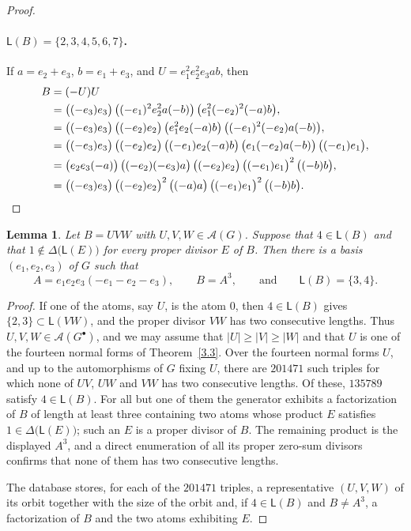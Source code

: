 \documentclass[a4paper, 10pt]{amsart}
\theoremstyle{plain}
\newtheorem{lemma}[theorem]{\bf Lemma}
\theoremstyle{definition}
\theoremstyle{definition}
\newcommand{\code}[1]{\texttt{\detokenize{#1}}}
\numberwithin{equation}{section}
\begin{document}
\begin{proof}
	\paragraph*{$\mathsf L(B)=\{2,3,4,5,6,7\}$.}
	If $a=e_2+e_3$,  $b=e_1+e_3$, and 
	$U=e_1^2e_2^2e_3ab$, then
	\begin{align*}
	B & = (-U)U \\
	&= \big( (-e_3){e_3}\big) \,\bigl((-e_1)^2e_2^2a(-b)\bigr) \,\bigl(e_1^2(-e_2)^2(-a)b\bigr),\\
	&= \big( (-e_3){e_3}\big) \, \big( (-e_2){e_2}\big)
	\,\bigl(e_1^2e_2(-a)b\bigr)
	\,\bigl((-e_1)^2(-e_2)a(-b)\bigr),\\
	&= \big( (-e_3){e_3}\big) \, \big( (-e_2){e_2}\big)
	\,\bigl((-e_1)e_2(-a)b\bigr)
	\,\bigl(e_1(-e_2)a(-b)\bigr)\, \big( (-e_1){e_1}\big),\\
	&=\bigl(e_2e_3(-a)\bigr)\,\bigl((-e_2)(-e_3)a\bigr)
	\, \big( (-e_2){e_2}\big)\, \big( (-e_1){e_1}\big)^2\, \big( (-b) {b}\big),\\
	&= \big( (-e_3){e_3}\big) \, \big( (-e_2){e_2}\big)^2\, \big( (-a){a}\big) \, \big( (-e_1){e_1}\big)^2\, \big( (-b){b}\big). \qedhere
	\end{align*}
	\end{proof}


\begin{lemma} \label{lem:comp:mixed-triples}
Let $B=UVW$ with $U,V,W \in \mathcal A (G)$.  Suppose that
$4 \in \mathsf L (B)$ and that $1 \notin \Delta \big(\mathsf L (E) \big)$ for every
proper divisor $E$ of $B$.  Then
there is a basis $(e_1,e_2,e_3)$ of $G$ such that
\[
 A = e_1e_2e_3(-e_1-e_2-e_3),  \qquad B = A^3, \qquad \text{and} \qquad \mathsf L (B) = \{3,4\}.
\]
\end{lemma}

\begin{proof}
If one of the atoms, say $U$, is the atom $0$, then $4 \in \mathsf L (B)$
gives $\{2,3\} \subset \mathsf L (VW)$, and the proper divisor $VW$ has two
consecutive lengths.  Thus $U, V, W \in \mathcal A (G^{\bullet})$, and we may
assume that $|U| \ge |V| \ge |W|$ and that $U$ is one of the fourteen normal forms
of Theorem~\ref{3.3}.  Over the fourteen normal forms $U$, and up to the
automorphisms of $G$ fixing $U$, there are $201471$ such triples for which none
of $UV$, $UW$ and $VW$ has two consecutive lengths.  Of these, $135789$ satisfy $4 \in \mathsf L (B)$.
For all but one of them the generator exhibits a factorization of $B$ of
length at least three containing two atoms whose product $E$ satisfies
$1 \in \Delta \big(\mathsf L (E) \big)$; such an $E$ is a proper divisor of $B$.  The
remaining product is the displayed $A^3$, and a direct enumeration of all
its proper zero-sum divisors confirms that none of them has two consecutive
lengths.

The database \code{consecutive-triples.jsonl} stores, for each of the
$201471$ triples, a representative $(U,V,W)$ of its orbit together with the
size of the orbit and, if $4 \in \mathsf L(B)$ and $B \ne A^3$, a
factorization of $B$ and the two atoms exhibiting $E$.
\end{proof}
\end{document}
